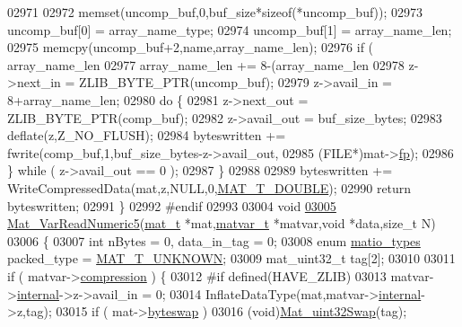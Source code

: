 \begin{DoxyCode}
{{{{{{{{{{{{{{{{02971 
02972         memset(uncomp\_buf,0,buf\_size*\textcolor{keyword}{sizeof}(*uncomp\_buf));
02973         uncomp\_buf[0] = array\_name\_type;
02974         uncomp\_buf[1] = array\_name\_len;
02975         memcpy(uncomp\_buf+2,name,array\_name\_len);
02976         \textcolor{keywordflow}{if} ( array\_name\_len %
02977             array\_name\_len += 8-(array\_name\_len %
02978         z->next\_in  = ZLIB\_BYTE\_PTR(uncomp\_buf);
02979         z->avail\_in = 8+array\_name\_len;
02980         \textcolor{keywordflow}{do} \{
02981             z->next\_out  = ZLIB\_BYTE\_PTR(comp\_buf);
02982             z->avail\_out = buf\_size\_bytes;
02983             deflate(z,Z\_NO\_FLUSH);
02984             byteswritten += fwrite(comp\_buf,1,buf\_size\_bytes-z->avail\_out,
02985                 (FILE*)mat->\hyperlink{struct__mat__t_a85f562e407ca9ad4d2a6e14f839432b7}{fp});
02986         \} \textcolor{keywordflow}{while} ( z->avail\_out == 0 );
02987     \}
02988 
02989     byteswritten += WriteCompressedData(mat,z,NULL,0,\hyperlink{group___m_a_t_ggacf7b3b879282b7ab3a51190e49bf3453a31e721ecf7e188196f83c32838288797}{MAT\_T\_DOUBLE});
02990     \textcolor{keywordflow}{return} byteswritten;
02991 \}
02992 \textcolor{preprocessor}{#endif}
02993 
03004 \textcolor{keywordtype}{void}
\hyperlink{mat5_8c_ad4a2e875b830830f0ec3cd678c0c6230}{03005} \hyperlink{mat5_8c_ad4a2e875b830830f0ec3cd678c0c6230}{Mat\_VarReadNumeric5}(\hyperlink{struct__mat__t}{mat\_t} *mat,\hyperlink{group___m_a_t_structmatvar__t}{matvar\_t} *matvar,\textcolor{keywordtype}{void} *data,\textcolor{keywordtype}{size\_t} N)
03006 \{
03007     \textcolor{keywordtype}{int} nBytes = 0, data\_in\_tag = 0;
03008     \textcolor{keyword}{enum} \hyperlink{group___m_a_t_gacf7b3b879282b7ab3a51190e49bf3453}{matio\_types} packed\_type = \hyperlink{group___m_a_t_ggacf7b3b879282b7ab3a51190e49bf3453a2a7318fe8bf9464935e7ed8902618293}{MAT\_T\_UNKNOWN};
03009     mat\_uint32\_t tag[2];
03010 
03011     \textcolor{keywordflow}{if} ( matvar->\hyperlink{group___m_a_t_aeef0466048621cb2c959ba7f6c774d06}{compression} ) \{
03012 \textcolor{preprocessor}{#if defined(HAVE\_ZLIB)}
03013         matvar->\hyperlink{group___m_a_t_a6e97e3ed9f40c49322c18561c2a94e92}{internal}->z->avail\_in = 0;
03014         InflateDataType(mat,matvar->\hyperlink{group___m_a_t_a6e97e3ed9f40c49322c18561c2a94e92}{internal}->z,tag);
03015         \textcolor{keywordflow}{if} ( mat->\hyperlink{struct__mat__t_a99d207977af5e04941ace56d71817a40}{byteswap} )
03016             (void)\hyperlink{endian_8c_a8cb0d0750e2eaf9840d95db531934f4f}{Mat\_uint32Swap}(tag);
}}}}}}}}}}}}}}}}
\end{DoxyCode}
